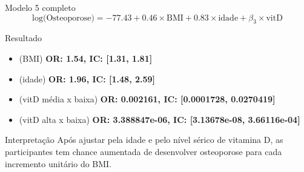 \documentclass{beamer}
\begin{document}
\begin{frame}{\scriptsize }
  \begin{exampleblock}{Modelo 5 completo}
    \tiny
    \begin{displaymath}
      \text{log(Osteoporose)} =-77.43 + 0.46 \times\text{BMI} + 0.83 \times\text{idade} + \beta_3 \times\text{vitD}
    \end{displaymath}
  \end{exampleblock}
  \begin{block}{Resultado}
    \footnotesize
    \begin{itemize}
      \scriptsize
    \item {\small (BMI)} {\bf OR: 1.54, IC: [1.31, 1.81]}
      \medskip
    \item {\small (idade)} {\bf OR: 1.96, IC: [1.48, 2.59]}
      \medskip
    \item {\small (vitD média x baixa)} {\bf OR: 0.002161, IC: [0.0001728, 0.0270419]}
      \medskip
    \item {\small (vitD alta x baixa)} {\bf OR: 3.388847e-06, IC: [3.13678e-08, 3.66116e-04]}
    \end{itemize}
  \end{block}
    \begin{block}{Interpretação}
    \footnotesize
    Após ajustar pela idade e pelo nível sérico de vitamina D, as participantes tem chance aumentada de desenvolver osteoporose para cada incremento unitário do BMI.
  \end{block}
\end{frame}

\end{document}
